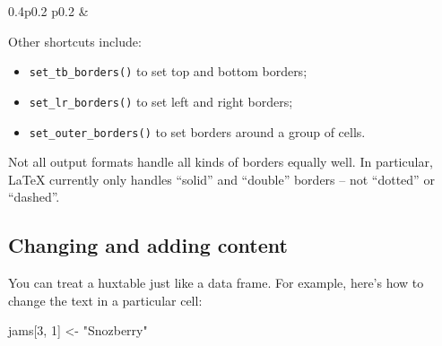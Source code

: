 \documentclass[]{article}
\newenvironment{Shaded}{\begin{snugshade}}{\end{snugshade}}
\newcommand{\DecValTok}[1]{\textcolor[rgb]{0.00,0.00,0.81}{#1}}
\newcommand{\NormalTok}[1]{#1}
\newcommand{\StringTok}[1]{\textcolor[rgb]{0.31,0.60,0.02}{#1}}
\providecommand{\tightlist}{%
  \setlength{\itemsep}{0pt}\setlength{\parskip}{0pt}}
\begin{document}
\begin{table}[ht]
\begin{centerbox}
\begin{threeparttable}
\begin{tabularx}{0.4\textwidth}{p{} p{}}
 &
 \tabularnewline[-0.5pt]


\end{tabularx}
\end{threeparttable}\par\end{centerbox}

\end{table}
 

\FloatBarrier

Other shortcuts include:

\begin{itemize}
\tightlist
\item
  \texttt{set\_tb\_borders()} to set top and bottom borders;
\item
  \texttt{set\_lr\_borders()} to set left and right borders;
\item
  \texttt{set\_outer\_borders()} to set borders around a group of cells.
\end{itemize}

Not all output formats handle all kinds of borders equally well. In
particular, LaTeX currently only handles ``solid'' and ``double''
borders -- not ``dotted'' or ``dashed''.

\hypertarget{changing-and-adding-content}{%
\subsection{Changing and adding
content}\label{changing-and-adding-content}}

You can treat a huxtable just like a data frame. For example, here's how
to change the text in a particular cell:

\begin{Shaded}
\begin{Highlighting}[]
\NormalTok{jams[}\DecValTok{3}\NormalTok{, }\DecValTok{1}\NormalTok{] <-}\StringTok{ "Snozberry"}
\end{Highlighting}
\end{Shaded}
\end{document}

